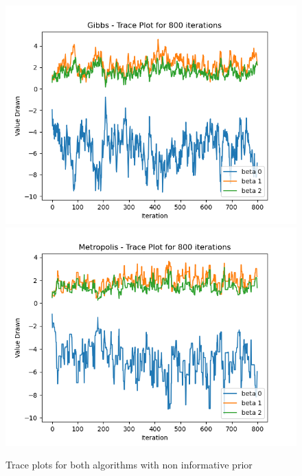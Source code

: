 \documentclass{article}
\begin{document}
\begin{figure}[htp]
    \centering
    \includegraphics[scale=0.6]{images/trace_gibbs_noinfo_800_warmup_0.png}
    \includegraphics[scale=0.6]{images/trace_metropolis_noinfo_800_warmup_0.png}
    \caption{Trace plots for both algorithms with non informative prior}
    \label{fig:trace_1}
\end{figure}


\end{document}
